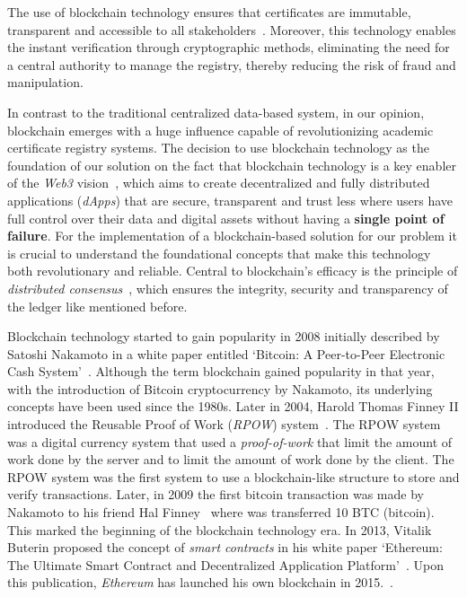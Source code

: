 The use of blockchain technology ensures that certificates are immutable, transparent and accessible to all stakeholders~\cite{alammary2019blockchain}. Moreover, this technology enables the instant verification through cryptographic methods,
eliminating the need for a central authority to manage the registry, thereby reducing the risk of fraud and manipulation.

In contrast to the traditional centralized data-based system, in our opinion, blockchain emerges with a huge influence capable of revolutionizing academic certificate registry systems.
The decision to use blockchain technology as the foundation of our solution on the fact that blockchain technology is a key enabler of the \textit{Web3} vision~\cite{buldas2022towards},
which aims to create decentralized and fully distributed applications (\textit{dApps}) that are secure, transparent and trust less where users have full control over their data and digital assets without having a \textbf{single point of failure}.
For the implementation of a blockchain-based solution for our problem it is crucial to understand the foundational concepts that make this technology both revolutionary and reliable.
Central to blockchain's efficacy is the principle of \textit{distributed consensus}~\cite{xiao2020survey}, which ensures the integrity, security and transparency of the ledger like mentioned before.


Blockchain technology started to gain popularity in 2008 initially described by Satoshi Nakamoto in a white paper entitled `Bitcoin: A Peer-to-Peer Electronic Cash System'~\cite{nakamoto2008bitcoin}.
Although the term blockchain gained popularity in that year, with the introduction of Bitcoin cryptocurrency by Nakamoto, its underlying concepts have been used since the 1980s.
Later in 2004, Harold Thomas Finney II introduced the Reusable Proof of Work (\textit{RPOW}) system~\cite{RPOW}. The RPOW system was a digital
currency system that used a \textit{proof-of-work} that limit the amount of work done by the server and to limit the amount of work done by the client.
The RPOW system was the first system to use a blockchain-like structure to store and verify transactions. Later, in 2009 the first bitcoin transaction was made by Nakamoto
to his friend Hal Finney~\cite{peterson2014hal} where was transferred 10 BTC (bitcoin). This marked the beginning of the blockchain technology era.
In 2013, Vitalik Buterin proposed the concept of \textit{smart contracts} in his white paper `Ethereum: The Ultimate Smart Contract and Decentralized Application Platform'~\cite{buterin2013ethereum}. Upon this publication,
\textit{Ethereum} has launched his own blockchain in 2015.~\cite{reiff2020bitcoin}.

